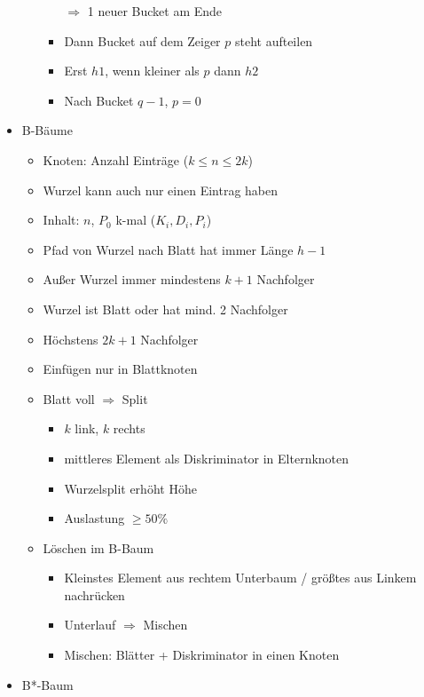 \documentclass[11pt, paper=a4, twocolumn]{scrartcl}
\begin{document}
\begin{itemize}
\begin{itemize}
\begin{itemize}
								$\Rightarrow$ 1 neuer 
								Bucket am Ende
							\item Dann Bucket auf dem Zeiger 
								$p$ steht aufteilen
							\item Erst $h1$, wenn kleiner als 
								$p$ dann $h2$
							\item Nach Bucket $q-1$, $p=0$
						\end{itemize}
				\end{itemize}
			\item B-Bäume
				\begin{itemize}
					\item Knoten: Anzahl Einträge ($k\leq n\leq 2k$)
					\item Wurzel kann auch nur einen Eintrag haben
					\item Inhalt: $n$, $P_0$ k-mal ($K_i,D_i,P_i$)
					\item Pfad von Wurzel nach Blatt hat immer Länge 
						$h-1$
					\item Außer Wurzel immer mindestens $k+1$ 
						Nachfolger
					\item Wurzel ist Blatt oder hat mind. 2 Nachfolger
					\item Höchstens $2k+1$ Nachfolger
					\item Einfügen nur in Blattknoten
					\item Blatt voll $\Rightarrow$ Split
						\begin{itemize}
							\item $k$ link, $k$ rechts
							\item mittleres Element als 
								Diskriminator in 
								Elternknoten
							\item Wurzelsplit erhöht Höhe
							\item Auslastung $\geq 50\%$
						\end{itemize}
					\item Löschen im B-Baum
						\begin{itemize}
							\item Kleinstes Element aus 
								rechtem Unterbaum 
								/ größtes aus Linkem 
								nachrücken
							\item Unterlauf $\Rightarrow$ 
								Mischen
							\item Mischen: Blätter + 
								Diskriminator in einen 
								Knoten
						\end{itemize}
				\end{itemize}
			\item B*-Baum
				\begin{itemize}

\end{itemize}
\end{itemize}
\end{document}
